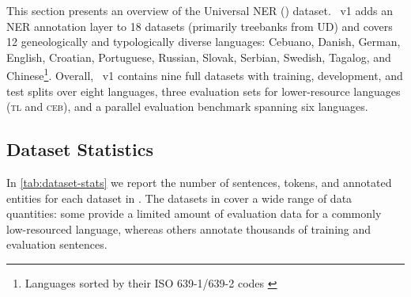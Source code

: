 

This section presents an overview of the Universal NER (\shortname) dataset.
\shortname{}~v1 adds an NER annotation layer to 18 datasets (primarily treebanks from UD) and covers 12 geneologically and typologically diverse languages: Cebuano, Danish, German, English, Croatian, Portuguese, Russian, Slovak, Serbian, Swedish, Tagalog, and Chinese\footnote{Languages sorted by their ISO 639-1/639-2 codes \citep{ISO639-1,ISO639-2}}. Overall, \shortname{}~v1 contains nine full datasets with training, development, and test splits over eight languages, three evaluation sets for lower-resource languages (\textsc{tl} and \textsc{ceb}), and a parallel evaluation benchmark spanning six languages.




\subsection{Dataset Statistics}
In \autoref{tab:dataset-stats} we report the number of sentences, tokens, and annotated entities for each dataset in \shortname{}.
The datasets in \shortname{} cover a wide range of data quantities: some provide a limited amount of evaluation data for a commonly low-resourced language, whereas others annotate thousands of training and evaluation sentences.


